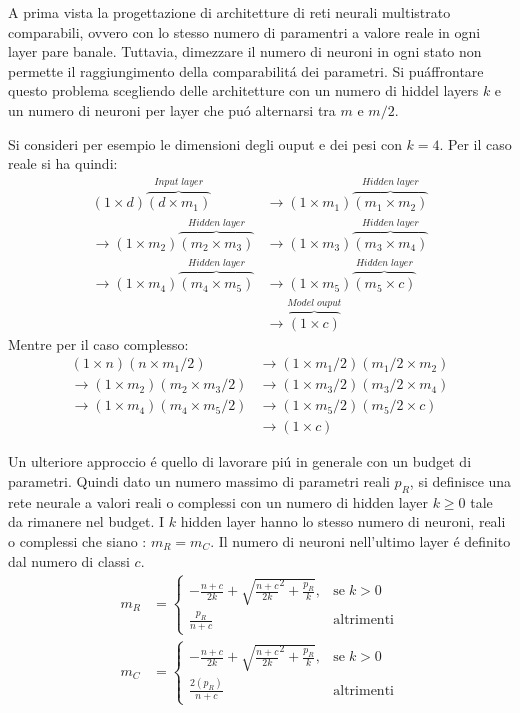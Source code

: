 \documentclass[a4paper,10pt]{article}
\begin{document}
 A prima vista la progettazione di architetture di reti neurali multistrato comparabili, ovvero con lo stesso numero di paramentri a valore reale in ogni layer pare banale. Tuttavia, dimezzare il numero di neuroni in ogni stato non permette il raggiungimento della comparabilit\'a dei parametri. Si pu\' affrontare questo problema scegliendo delle architetture con un numero di hiddel layers $k$ e un numero di neuroni per layer che pu\'o alternarsi tra $m$ e $m/2$. 
 
 Si consideri per esempio le dimensioni degli ouput e dei pesi con $k=4$. Per il caso reale si ha quindi:
 \begin{align}
  (1 \times d)\overbrace{(d \times m_1)}^{Input \; layer} &\to (1 \times m_1)\overbrace{(m_1 \times m_2)}^{Hidden \; layer} \\
  \to (1 \times m_2)\overbrace{(m_2 \times m_3)}^{Hidden \; layer} &\to (1 \times m_3)\overbrace{(m_3 \times m_4)}^{Hidden \; layer} \\
  \to (1 \times m_4)\overbrace{(m_4 \times m_5)}^{Hidden \; layer} &\to (1 \times m_5)\overbrace{(m_5 \times c)}^{Hidden \; layer} \\
  &\to \overbrace{(1 \times c)}^{Model \; ouput}
 \end{align}
Mentre per il caso complesso:
 \begin{align}
  (1 \times n)(n \times m_1/2) &\to (1 \times m_1/2)(m_1/2 \times m_2)\\
  \to (1 \times m_2)(m_2 \times m_3/2) &\to (1 \times m_3/2)(m_3/2 \times m_4)\\
  \to (1 \times m_4)(m_4 \times m_5/2) &\to (1 \times m_5/2)(m_5/2 \times c) \\
  &\to (1 \times c)
 \end{align}
 
 Un ulteriore approccio \'e quello di lavorare pi\'u in generale con un budget di parametri. Quindi dato un numero massimo di parametri reali $p_R$, si definisce una rete neurale a valori reali o complessi con un numero di hidden layer $k \ge 0$ tale da rimanere nel budget. I $k$ hidden layer hanno lo stesso numero di neuroni, reali o complessi che siano : $m_R = m_C$. Il numero di neuroni nell'ultimo layer \'e definito dal numero di classi $c$.
 \begin{align}
  m_R &= \begin{cases}
          -\frac{n+c}{2k} + \sqrt{ \frac{n+c}{2k}^2 + \frac{p_R}{k}}, & \mbox{se} \; k>0\\
          \frac{p_R}{n+c} & \mbox{altrimenti}
         \end{cases} \label{LastLayerR}\\
  m_C &= \begin{cases}
          -\frac{n+c}{2k} + \sqrt{ \frac{n+c}{2k}^2 + \frac{p_R}{k}}, & \mbox{se} \; k>0\\
          \frac{2(p_R)}{n+c} & \mbox{altrimenti}
         \end{cases} \label{LastLayerC}
 \end{align}
\end{document}
